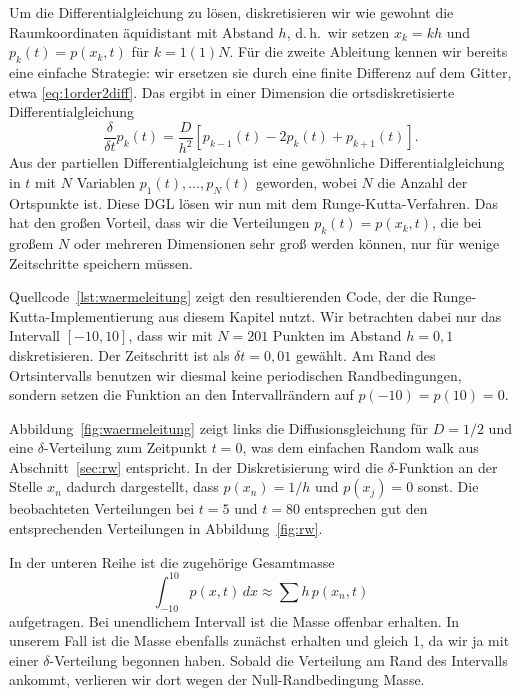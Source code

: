 Um die Differentialgleichung zu lösen, diskretisieren wir wie gewohnt
die Raumkoordinaten äquidistant mit Abstand $h$, d.\,h.\, wir setzen
$x_k = kh$ und $p_k(t) = p(x_k, t)$ für $k=1(1)N$. Für die zweite
Ableitung kennen wir bereits eine einfache Strategie: wir ersetzen sie
durch eine finite Differenz auf dem Gitter, etwa
\eqref{eq:1order2diff}. Das ergibt in einer Dimension die
ortsdiskretisierte Differentialgleichung
\begin{equation}
  \label{eq:discrdiff}
  \frac{\delta}{\delta t} p_k(t) =
  \frac{D}{h^2} \left[p_{k-1}(t) - 2 p_k(t) + p_{k+1}(t)\right].
\end{equation}
Aus der partiellen Differentialgleichung ist eine gewöhnliche
Differentialgleichung in $t$ mit $N$ Variablen
$p_1(t),\ldots,p_N(t)$ geworden, wobei $N$ die Anzahl der Ortspunkte
ist. Diese DGL lösen wir nun mit dem Runge-Kutta-Verfahren. Das hat
den großen Vorteil, dass wir die Verteilungen $p_k(t) = p(x_k, t)$, die bei
großem $N$ oder mehreren Dimensionen sehr groß werden können, nur für
wenige Zeitschritte speichern müssen.

Quellcode~\ref{lst:waermeleitung} zeigt den resultierenden Code, der
die Runge-Kutta-Implementierung aus diesem Kapitel nutzt. Wir
betrachten dabei nur das Intervall $[-10,10]$, dass wir mit $N=201$
Punkten im Abstand $h=0,1$ diskretisieren. Der Zeitschritt ist als
$\delta t=0,01$ gewählt. Am Rand des Ortsintervalls benutzen
wir diesmal keine periodischen Randbedingungen, sondern setzen die
Funktion an den Intervallrändern auf $p(-10) = p(10) = 0$.

Abbildung~\ref{fig:waermeleitung} zeigt links die Diffusionsgleichung
für $D=1/2$ und eine $\delta$-Verteilung zum Zeitpunkt $t=0$, was dem
einfachen Random walk aus Abschnitt~\ref{sec:rw} entspricht. In der
Diskretisierung wird die $\delta$-Funktion an der Stelle $x_n$ dadurch
dargestellt, dass $p(x_n)=1/h$ und $p(x_j)=0$ sonst. Die beobachteten
Verteilungen bei $t=5$ und $t=80$ entsprechen gut den entsprechenden
Verteilungen in Abbildung~\ref{fig:rw}.

In der unteren Reihe ist die zugehörige Gesamtmasse
\begin{equation}
  \int_{-10}^{10} p(x, t)\, dx \approx \sum h\, p(x_n, t)
\end{equation}
aufgetragen. Bei unendlichem Intervall ist die Masse offenbar
erhalten. In unserem Fall ist die Masse ebenfalls zunächst erhalten
und gleich 1, da wir ja mit einer $\delta$-Verteilung begonnen
haben. Sobald die Verteilung am Rand des Intervalls ankommt, verlieren
wir dort wegen der Null-Randbedingung Masse.

